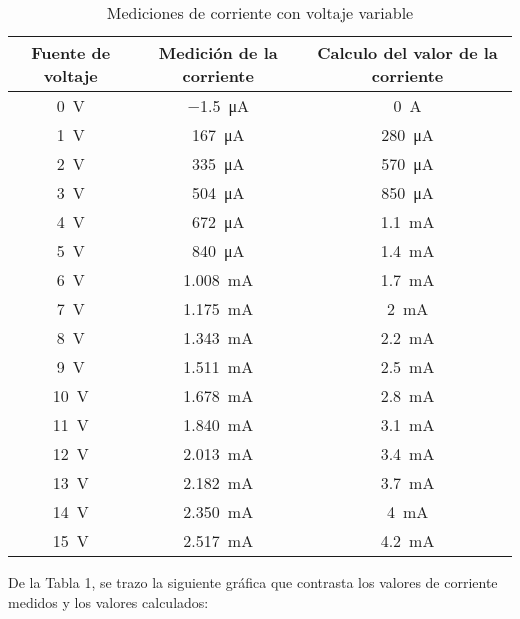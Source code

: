 \documentclass[a4paper,12pt]{article}
\begin{document}
\begin{table}[ht!]
\begin{center}
\begin{tabular}{|c c c|}
	\hline
		Fuente de voltaje & Medición de la corriente & Calculo del valor de la corriente\\ [0.5ex]
	\hline
	\SI{0}{\volt} & \SI{-1.5}{\uA} & \SI{0}{\A} \\ \hline
	\SI{1}{\volt} & \SI{167}{\uA} & \SI{280}{\uA} \\ \hline
	\SI{2}{\volt} & \SI{335}{\uA} & \SI{570}{\uA} \\ \hline
	\SI{3}{\volt} & \SI{504}{\uA} & \SI{850}{\uA} \\ \hline
	\SI{4}{\volt} & \SI{672}{\uA} & \SI{1.1}{\mA} \\ \hline
	\SI{5}{\volt} & \SI{840}{\uA} & \SI{1.4}{\mA} \\ \hline
	\SI{6}{\volt} & \SI{1.008}{\mA} & \SI{1.7}{\mA} \\ \hline
	\SI{7}{\volt} & \SI{1.175}{\mA} & \SI{2}{\mA} \\ \hline
	\SI{8}{\volt} & \SI{1.343}{\mA} & \SI{2.2}{\mA} \\ \hline
	\SI{9}{\volt} & \SI{1.511}{\mA} & \SI{2.5}{\mA} \\ \hline
	\SI{10}{\volt} & \SI{1.678}{\mA} & \SI{2.8}{\mA} \\ \hline
	\SI{11}{\volt} & \SI{1.840}{\mA} & \SI{3.1}{\mA} \\ \hline
	\SI{12}{\volt} & \SI{2.013}{\mA} & \SI{3.4}{\mA} \\ \hline
	\SI{13}{\volt} & \SI{2.182}{\mA} & \SI{3.7}{\mA} \\ \hline
	\SI{14}{\volt} & \SI{2.350}{\mA} & \SI{4}{\mA} \\ \hline
	\SI{15}{\volt} & \SI{2.517}{\mA} & \SI{4.2}{\mA} \\ \hline
\end{tabular}
\label{table:1}
\caption{Mediciones de corriente con voltaje variable}
\end{center}
\end{table}

\vspace{1cm}

De la Tabla 1, se trazo la siguiente gráfica que contrasta los valores de corriente medidos y los valores calculados:

\vspace{1cm}
\end{document}
